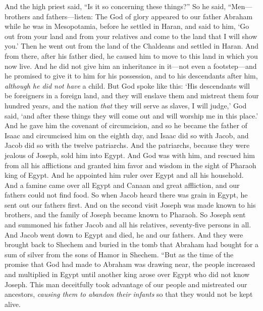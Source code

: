 \begin{biblechapter} %
 And the high priest said, “Is it so concerning these things?”
\verse So he said, “Men—brothers and fathers—listen: The God of glory appeared to our father Abraham while he was in Mesopotamia, before he settled in Haran,
\verse and said to him, ‘Go out from your land and from your relatives and come to the land that I will show you.’
\verse Then he went out from the land of the Chaldeans and settled in Haran. And from there, after his father died, he caused him to move to this land in which you now live.
\verse And he did not give him an inheritance in it—not even a footstep—and he promised to give it to him for his possession, and to his descendants after him, \textit{although he did not have} a child.
\verse But God spoke like this: ‘His descendants will be foreigners in a foreign land, and they will enslave them and mistreat them four hundred years,
\verse and the nation \textit{that} they will serve as slaves, I will judge,’ God said, ‘and after these things they will come out and will worship me in this place.’
\verse And he gave him the covenant of circumcision, and so he became the father of Isaac and circumcised him on the eighth day, and Isaac did so with Jacob, and Jacob did so with the twelve patriarchs.
\verse And the patriarchs, because they were jealous of Joseph, sold him into Egypt. And God was with him,
\verse and rescued him from all his afflictions and granted him favor and wisdom in the sight of Pharaoh king of Egypt. And he appointed him ruler over Egypt and all his household.
\verse And a famine came over all Egypt and Canaan and great affliction, and our fathers could not find food.
\verse So when Jacob heard there was grain in Egypt, he sent out our fathers first.
\verse And on the second visit Joseph was made known to his brothers, and the family of Joseph became known to Pharaoh.
\verse So Joseph sent and summoned his father Jacob and all his relatives, seventy-five persons in all.
\verse And Jacob went down to Egypt and died, he and our fathers.
\verse And they were brought back to Shechem and buried in the tomb that Abraham had bought for a sum of silver from the sons of Hamor in Shechem.
\verse “But as the time of the promise that God had made to Abraham was drawing near, the people increased and multiplied in Egypt
\verse until another king arose over Egypt who did not know Joseph.
\verse This man deceitfully took advantage of our people and mistreated our ancestors, \textit{causing them to abandon their infants} so that they would not be kept alive.

\end{biblechapter}
